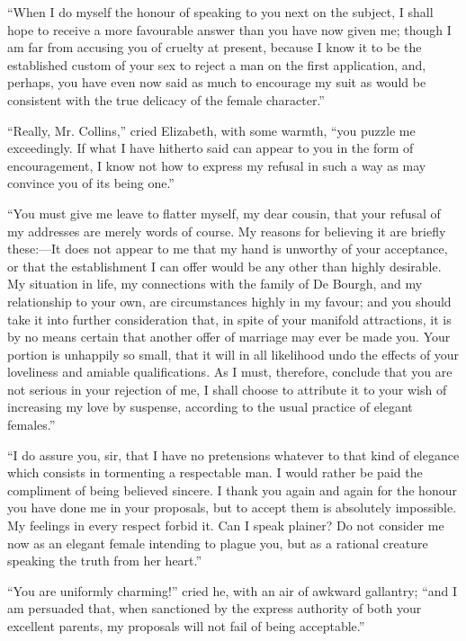\documentclass[10pt]{book}
\begin{document}
   “When I do myself the honour of speaking to you next on the subject, I
shall hope to receive a more favourable answer than you have now given
me; though I am far from accusing you of cruelty at present, because I
know it to be the established custom of your sex to reject a man on the
first application, and, perhaps, you have even now said as much to
encourage my suit as would be consistent with the true delicacy of the
female character.”
  

   “Really, Mr. Collins,” cried Elizabeth, with some warmth, “you puzzle me
exceedingly. If what I have hitherto said can appear to you in the form
of encouragement, I know not how to express my refusal in such a way as
may convince you of its being one.”
  

   “You must give me leave to flatter myself, my dear cousin, that your
refusal of my addresses are merely words of course. My reasons for
believing it are briefly these:—It does not appear to me that my hand
is unworthy of your acceptance, or that the establishment I can offer would
be any other than highly desirable. My situation in life, my connections
with the family of De Bourgh, and my relationship to your own, are
circumstances highly in my favour; and you should take
   it into further
consideration that, in spite of your manifold attractions, it is by no
means certain that another offer of marriage may ever be made you. Your
portion is unhappily so small, that it will in all likelihood undo the
effects of your loveliness and amiable qualifications. As I must,
therefore, conclude that you are not serious in your rejection of me, I
shall choose to attribute it to your wish of increasing my love by
suspense, according to the usual practice of elegant females.”
  

   “I do assure you, sir, that I have no pretensions whatever to that kind
of elegance which consists in tormenting a respectable man. I would
rather be paid the compliment of being believed sincere. I thank you
again and again for the honour you have done me in your proposals, but
to accept them is absolutely impossible. My feelings in every respect
forbid it. Can I speak plainer? Do not consider me now as an elegant
female intending to plague you, but as a rational creature speaking the
truth from her heart.”
  

   “You are uniformly charming!” cried he, with an air of awkward
gallantry; “and I am persuaded that, when sanctioned by the express
authority of both your excellent parents, my proposals will not fail of
being acceptable.”
  
\end{document}
